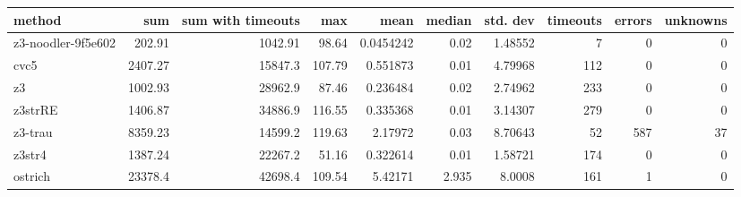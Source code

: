 \begin{tabular}{lrrrrrrrrr}
\hline
 method             &      sum &   sum with timeouts &    max &      mean &   median &   std. dev &   timeouts &   errors &   unknowns \\
\hline
 z3-noodler-9f5e602 &   202.91 &             1042.91 &  98.64 & 0.0454242 &    0.02  &    1.48552 &          7 &        0 &          0 \\
 cvc5               &  2407.27 &            15847.3  & 107.79 & 0.551873  &    0.01  &    4.79968 &        112 &        0 &          0 \\
 z3                 &  1002.93 &            28962.9  &  87.46 & 0.236484  &    0.02  &    2.74962 &        233 &        0 &          0 \\
 z3strRE            &  1406.87 &            34886.9  & 116.55 & 0.335368  &    0.01  &    3.14307 &        279 &        0 &          0 \\
 z3-trau            &  8359.23 &            14599.2  & 119.63 & 2.17972   &    0.03  &    8.70643 &         52 &      587 &         37 \\
 z3str4             &  1387.24 &            22267.2  &  51.16 & 0.322614  &    0.01  &    1.58721 &        174 &        0 &          0 \\
 ostrich            & 23378.4  &            42698.4  & 109.54 & 5.42171   &    2.935 &    8.0008  &        161 &        1 &          0 \\
\hline
\end{tabular}
